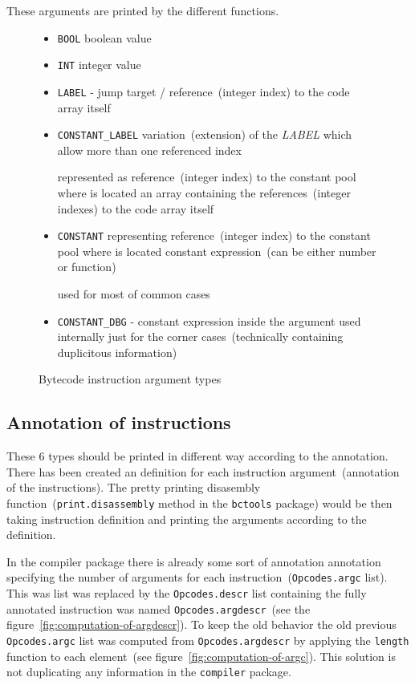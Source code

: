 \documentclass[thesis=M,english]{FITthesis}[2018/10/20]
\newcommand{\code}[1]{\texttt{#1}}
\begin{document}
These arguments are printed by the different functions.

\begin{figure}[H]
\begin{itemize}
	\item \code{BOOL} boolean value

	\item \code{INT} integer value

	\item \code{LABEL} - jump target / reference~(integer index) to the code array itself

	\item \code{CONSTANT{\_}LABEL} variation~(extension) of the \textit{LABEL} which allow more than one referenced index
	
	represented as reference~(integer index) to the constant pool where is located an array containing the references~(integer indexes) to the code array itself

	\item \code{CONSTANT} representing reference~(integer index) to the constant pool where is located constant expression~(can be either number or function)

	used for most of common cases

	\item \code{CONSTANT{\_}DBG} - constant expression inside the argument used internally just for the corner cases~(technically containing duplicitous information)
\end{itemize}
	\caption{Bytecode instruction argument types}\label{fig:bytecode-argument-types}
\end{figure}


\subsection{Annotation of instructions}\label{annotation-of-instructions}
These 6 types should be printed in different way according to the annotation. There has been created an definition for each instruction argument~(annotation of the instructions). The pretty printing disasembly function~(\code{print.disassembly} method in the \code{bctools} package) would be then taking instruction definition and printing the arguments according to the definition. 

In the compiler package there is already some sort of annotation annotation specifying the number of arguments for each instruction~(\code{Opcodes.argc} list). This was list was replaced by the \code{Opcodes.descr} list containing the fully annotated instruction was named \code{Opcodes.argdescr}~(see the figure~\ref{fig:computation-of-argdescr}). To keep the old behavior the old previous \code{Opcodes.argc} list was computed from \code{Opcodes.argdescr} by applying the \code{length} function to each element~(see figure~\ref{fig:computation-of-argc}). This solution is not duplicating any information in the \code{compiler} package.
\end{document}
